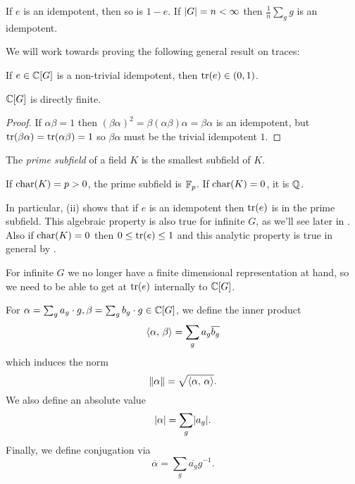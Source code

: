 \begin{remark}
    If $e$ is an idempotent, then so is $1-e$.
    If $\lvert G \rvert = n < \infty$ then $\frac{1}{n} \sum_g g$ is an idempotent.
\end{remark}

We will work towards proving the following general result on traces:
\begin{theorem}[Kaplansky]
    \label{theorem:kaplansky}
    If $e \in \mathbb{C}[G]$ is a non-trivial idempotent, then $\operatorname{tr}(e) \in (0, 1)$.
\end{theorem}

\begin{corollary}
    \label{corollary:CG_df}
    $\mathbb{C}[G]$ is directly finite.
\end{corollary}

\begin{proof}
    If $\alpha \beta = 1$ then $(\beta \alpha)^2 = \beta (\alpha \beta) \alpha = \beta \alpha$ is an idempotent, but $\operatorname{tr}(\beta \alpha) = \operatorname{tr}(\alpha \beta) = 1$ so $\beta \alpha$ must be the trivial idempotent $1$.
\end{proof}

\begin{definition}
    The \emph{prime subfield} of a field $K$ is the smallest subfield of $K$.
\end{definition}
If $\mathrm{char}(K) = p > 0$, the prime subfield is $\mathbb{F}_p$.
If $\mathrm{char}(K) = 0$, it is $\mathbb{Q}$.

In particular,  (ii) shows that if $e$ is an idempotent then $\operatorname{tr}(e)$ is in the prime subfield.
This algebraic property is also true for infinite $G$, as we'll see later in .
Also if $\mathrm{char}(K) = 0$ then $0 \leq \operatorname{tr}(e) \leq 1$ and this analytic property is true in general by .

For infinite $G$ we no longer have a finite dimensional representation at hand, so we need to be able to get at $\operatorname{tr}(e)$ internally to $\mathbb{C}[G]$.

\begin{definition}
    For $\alpha = \sum_g a_g \cdot g, \beta = \sum_g b_g \cdot g \in \mathbb{C}[G]$, we define the inner product \[
        \langle \alpha, \, \beta \rangle = \sum_g a_g \overline{b_g}
    \] which induces the norm \[
        \left\lVert \alpha \right\rVert = \sqrt{\langle \alpha, \, \alpha \rangle}.
    \] We also define an absolute value \[
        \lvert \alpha \rvert = \sum_g \lvert a_g \rvert.
    \] Finally, we define conjugation via \[
        \overline{\alpha} = \sum_g \overline{a_g} g^{-1}.
    \]
\end{definition}

